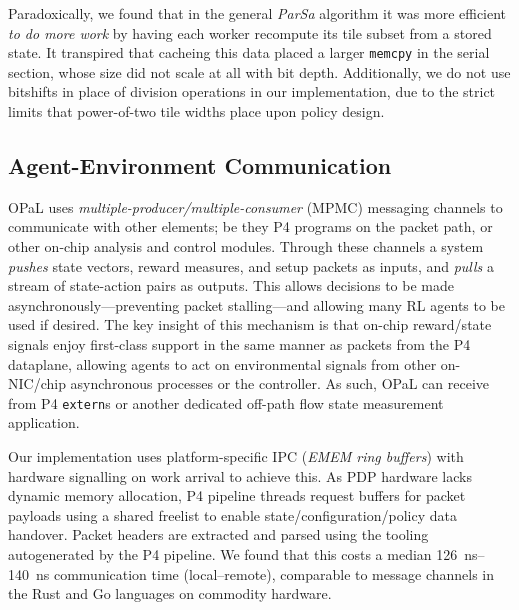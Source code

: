 \documentclass[
sigconf,natbib=false
]{acmart}
\newcommand{\approachshort}{OPaL}
\begin{document}
Paradoxically, we found that in the general \emph{ParSa} algorithm it was more efficient \emph{to do more work} by having each worker recompute its tile subset from a stored state.
It transpired that cacheing this data placed a larger \texttt{memcpy} in the serial section, whose size did not scale at all with bit depth.
Additionally, we do not use bitshifts in place of division operations in our implementation, due to the strict limits that power-of-two tile widths place upon policy design.

\subsection{Agent-Environment Communication}\label{sec:agent-environment-communication}
\approachshort{} uses \emph{multiple-producer/multiple-consumer} (MPMC) messaging channels to communicate with other elements; be they P4 programs on the packet path, or other on-chip analysis and control modules.
Through these channels a system \emph{pushes} state vectors, reward measures, and setup packets as inputs, and \emph{pulls} a stream of state-action pairs as outputs.
This allows decisions to be made asynchronously---preventing packet stalling---and allowing many RL agents to be used if desired.
The key insight of this mechanism is that on-chip reward/state signals enjoy first-class support in the same manner as packets from the P4 dataplane, allowing agents to act on environmental signals from other on-NIC/chip asynchronous processes or the controller.
As such, \approachshort{} can receive from P4 \texttt{extern}s or another dedicated off-path flow state measurement application.

Our implementation uses platform-specific IPC (\emph{EMEM ring buffers}) with hardware signalling on work arrival to achieve this.
As PDP hardware lacks dynamic memory allocation, P4 pipeline threads request buffers for packet payloads using a shared freelist to enable state/configuration/policy data handover.
Packet headers are extracted and parsed using the tooling autogenerated by the P4 pipeline.
We found that this costs a median \SIrange{126}{140}{\nano\second} communication time (local--remote), comparable to message channels in the Rust and Go languages on commodity hardware.

\end{document}
